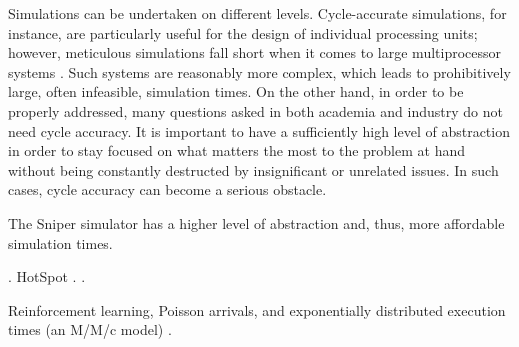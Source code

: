 Simulations can be undertaken on different levels. Cycle-accurate simulations,
for instance, are particularly useful for the design of individual processing
units; however, meticulous simulations fall short when it comes to large
multiprocessor systems \cite{carlson2011}. Such systems are reasonably more
complex, which leads to prohibitively large, often infeasible, simulation times.
On the other hand, in order to be properly addressed, many questions asked in
both academia and industry do not need cycle accuracy. It is important to have a
sufficiently high level of abstraction in order to stay focused on what matters
the most to the problem at hand without being constantly destructed by
insignificant or unrelated issues. In such cases, cycle accuracy can become a
serious obstacle.

The Sniper simulator has a higher level of abstraction \cite{carlson2011} and,
thus, more affordable simulation times.

 \cite{li2009}.
HotSpot \cite{skadron2004}.
 \cite{sridhar2010}.

Reinforcement learning, Poisson arrivals, and exponentially distributed
execution times (an M/M/c model) \cite{lu2015}.

